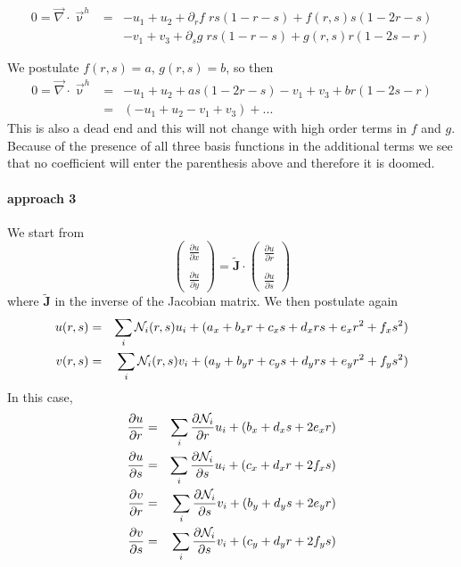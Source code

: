 \begin{eqnarray}
0=\vec\nabla\cdot\vec\upnu^h
&=& 
  -u_1+u_2 + \partial_r f \; rs(1-r-s) + f(r,s)s(1-2r-s) \\
&&-v_1+v_3 + \partial_s g \; rs(1-r-s) + g(r,s)r(1-2s-r)
\end{eqnarray}


We postulate $f(r,s)=a$, $g(r,s)=b$, so then 
\begin{eqnarray}
0=\vec\nabla\cdot\vec\upnu^h 
&=&   -u_1+u_2 +  as(1-2r-s) -v_1+v_3 +  br(1-2s-r) \\
&=&  (-u_1+u_2 -v_1+v_3) + ...
\end{eqnarray}
This is also a dead end and this will not change with high order 
terms in $f$ and $g$. Because of the presence of all three 
basis functions in the additional terms we see that no 
coefficient will enter the parenthesis above and therefore it is doomed. 


\paragraph{approach 3} 

We start from
\[
\left(
\begin{array}{c}
\frac{\partial u}{\partial x} \\ \\
\frac{\partial u}{\partial y} 
\end{array}
\right)
=
\tilde{\bm J} \cdot
\left(
\begin{array}{c}
\frac{\partial u}{\partial r} \\ \\
\frac{\partial u}{\partial s} 
\end{array}
\right)
\]
where $\tilde{\bm J}$ in the inverse of the Jacobian matrix.
We then postulate again
\begin{eqnarray}
u(r,s)&=&\sum_i {\mathcal{N}}_i(r,s) u_i + (a_x + b_xr + c_xs + d_xrs + e_xr^2 + f_xs^2) \nonumber\\ 
v(r,s)&=&\sum_i {\mathcal{N}}_i(r,s) v_i + (a_y + b_yr + c_ys + d_yrs + e_yr^2 + f_ys^2) \nonumber
\end{eqnarray}
In this case,
\begin{eqnarray}
\frac{\partial u}{\partial r}&=&\sum_i \frac{\partial {\mathcal{N}}_i}{\partial r} u_i + (b_x + d_xs + 2e_xr ) \\
\frac{\partial u}{\partial s}&=&\sum_i \frac{\partial {\mathcal{N}}_i}{\partial s} u_i + (c_x + d_xr + 2f_xs ) \\
\frac{\partial v}{\partial r}&=&\sum_i \frac{\partial {\mathcal{N}}_i}{\partial s} v_i + (b_y + d_ys + 2e_yr ) \\
\frac{\partial v}{\partial s}&=&\sum_i \frac{\partial {\mathcal{N}}_i}{\partial s} v_i + (c_y + d_yr + 2f_ys ) 
\end{eqnarray}


